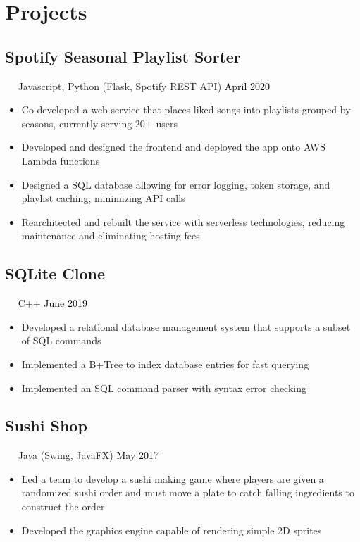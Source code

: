 \documentclass{article}
\newcommand{\resumesection}[3]{
    \subsection*{#1}
    \ 
    \ 
    \small
    \textcolor{csufgrey}{#2}
    \normalsize
    \hfill
    \textcolor{black}{#3}
    \normalsize
}
\begin{document}
\section*{Projects}
\resumesection{Spotify Seasonal Playlist Sorter}{Javascript, Python (Flask, Spotify REST API)}{April 2020}
\begin{itemize}
    \item Co-developed a web service that places liked songs into playlists grouped by seasons, currently serving 20+ users
    \item Developed and designed the frontend and deployed the app onto AWS Lambda functions
    \item Designed a SQL database allowing for error logging, token storage, and playlist caching, minimizing API calls
    \item Rearchitected and rebuilt the service with serverless technologies, reducing maintenance and eliminating hosting fees
\end{itemize}

\resumesection{SQLite Clone}{C++}{June 2019}
\begin{itemize}
    \item Developed a relational database management system that supports a subset of SQL commands
    \item Implemented a B+Tree to index database entries for fast querying
    \item Implemented an SQL command parser with syntax error checking
\end{itemize}

\resumesection{Sushi Shop}{Java (Swing, JavaFX)}{May 2017}
\begin{itemize}
    \item Led a team to develop a sushi making game where players are given a randomized sushi order and must move a plate to catch falling ingredients to construct the order
    \item Developed the graphics engine capable of rendering simple 2D sprites
\end{itemize}
\end{document}
